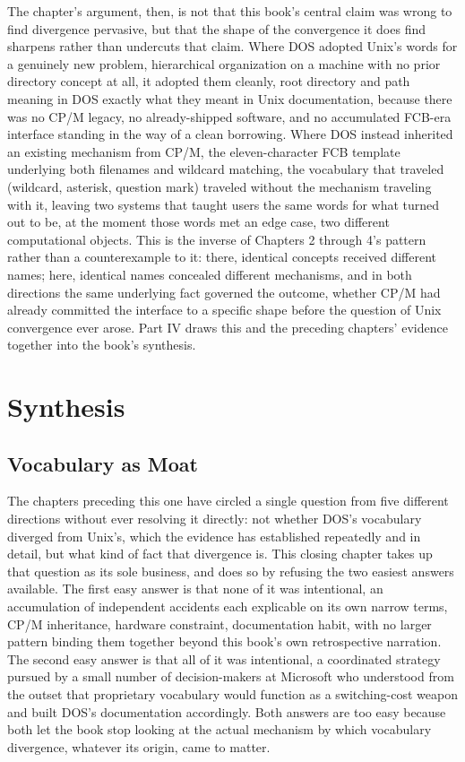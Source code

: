 \documentclass[11pt]{book}
\begin{document}
The chapter's argument, then, is not that this book's central claim was wrong to find divergence pervasive, but that the shape of the convergence it does find sharpens rather than undercuts that claim. Where DOS adopted Unix's words for a genuinely new problem, hierarchical organization on a machine with no prior directory concept at all, it adopted them cleanly, root directory and path meaning in DOS exactly what they meant in Unix documentation, because there was no CP/M legacy, no already-shipped software, and no accumulated FCB-era interface standing in the way of a clean borrowing. Where DOS instead inherited an existing mechanism from CP/M, the eleven-character FCB template underlying both filenames and wildcard matching, the vocabulary that traveled (wildcard, asterisk, question mark) traveled without the mechanism traveling with it, leaving two systems that taught users the same words for what turned out to be, at the moment those words met an edge case, two different computational objects. This is the inverse of Chapters 2 through 4's pattern rather than a counterexample to it: there, identical concepts received different names; here, identical names concealed different mechanisms, and in both directions the same underlying fact governed the outcome, whether CP/M had already committed the interface to a specific shape before the question of Unix convergence ever arose. Part IV draws this and the preceding chapters' evidence together into the book's synthesis.

\part{Synthesis}

\chapter{Vocabulary as Moat}

The chapters preceding this one have circled a single question from five different directions without ever resolving it directly: not whether DOS's vocabulary diverged from Unix's, which the evidence has established repeatedly and in detail, but what kind of fact that divergence is. This closing chapter takes up that question as its sole business, and does so by refusing the two easiest answers available. The first easy answer is that none of it was intentional, an accumulation of independent accidents each explicable on its own narrow terms, CP/M inheritance, hardware constraint, documentation habit, with no larger pattern binding them together beyond this book's own retrospective narration. The second easy answer is that all of it was intentional, a coordinated strategy pursued by a small number of decision-makers at Microsoft who understood from the outset that proprietary vocabulary would function as a switching-cost weapon and built DOS's documentation accordingly. Both answers are too easy because both let the book stop looking at the actual mechanism by which vocabulary divergence, whatever its origin, came to matter.
\end{document}
